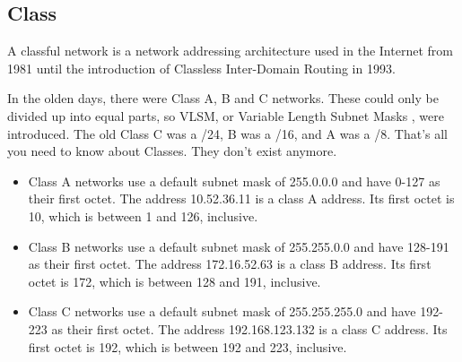 \documentclass[a4paper]{report}
\begin{document}
\subsection{Class}
A classful network is a network addressing architecture used in the Internet from 1981 until the introduction of Classless Inter-Domain Routing in 1993. 

 In the olden days, there were Class A, B and C networks. These could only be divided up into equal parts, so VLSM, or Variable Length Subnet Masks , were introduced. The old Class C was a /24, B was a /16, and A was a /8. That’s all you need to know about Classes. They don’t exist anymore.

\begin{itemize}
  \item Class A networks use a default subnet mask of 255.0.0.0 and have 0-127 as their first octet. The address 10.52.36.11 is a class A address. Its first octet is 10, which is between 1 and 126, inclusive.
  \item Class B networks use a default subnet mask of 255.255.0.0 and have 128-191 as their first octet. The address 172.16.52.63 is a class B address. Its first octet is 172, which is between 128 and 191, inclusive.
  \item Class C networks use a default subnet mask of 255.255.255.0 and have 192-223 as their first octet. The address 192.168.123.132 is a class C address. Its first octet is 192, which is between 192 and 223, inclusive.
\end{itemize}
\end{document}
